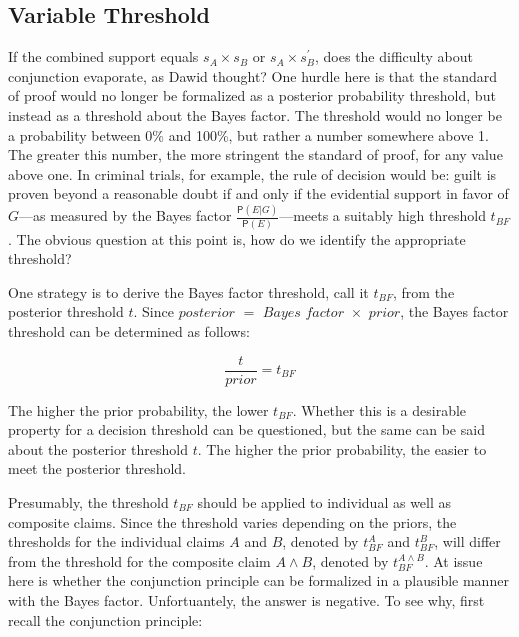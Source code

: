 \documentclass[10pt,dvipsnames,enabledeprecatedfontcommands]{scrartcl}
\newcommand{\pr}[1]{\mathsf{P}(#1)}
\begin{document}
\hypertarget{variable-threshold}{%
\subsection{Variable Threshold}\label{variable-threshold}}

If the combined support equals \(s_{A}\times s_{B}\) or
\(s_{A}\times s^{'}_{B}\), does the difficulty about conjunction
evaporate, as Dawid thought? One hurdle here is that the standard of
proof would no longer be formalized as a posterior probability
threshold, but instead as a threshold about the Bayes factor. The
threshold would no longer be a probability between 0\% and 100\%, but
rather a number somewhere above 1. The greater this number, the more
stringent the standard of proof, for any value above one. In criminal
trials, for example, the rule of decision would be: guilt is proven
beyond a reasonable doubt if and only if the evidential support in favor
of \(G\)---as measured by the Bayes factor
\(\frac{\pr{E | G}}{\pr{E}}\)---meets a suitably high threshold
\(t_{BF}\). The obvious question at this point is, how do we identify
the appropriate
threshold?

One strategy is to derive the Bayes factor threshold, call it
\(t_{BF}\), from the posterior threshold \(t\). Since
\(\textit{posterior }=\textit{ Bayes factor }\times \textit{ prior}\),
the Bayes factor threshold can be determined as follows:

\[\frac{t}{\textit{prior}}=t_{BF}\]

\noindent The higher the prior probability, the lower \(t_{BF}\).
Whether this is a desirable property for a decision threshold can be
questioned, but the same can be said about the posterior threshold
\(t\). The higher the prior probability, the easier to meet the
posterior threshold.

Presumably, the threshold \(t_{BF}\) should be applied to individual as
well as composite claims. Since the threshold varies depending on the
priors, the thresholds for the individual claims \(A\) and \(B\),
denoted by \(t_{BF}^A\) and \(t_{BF}^B\), will differ from the threshold
for the composite claim \(A \wedge B\), denoted by
\(t_{BF}^{A\wedge B}\). At issue here is whether the conjunction
principle can be formalized in a plausible manner with the Bayes factor.
Unfortuantely, the answer is negative. To see why, first recall the
conjunction principle:
\end{document}
